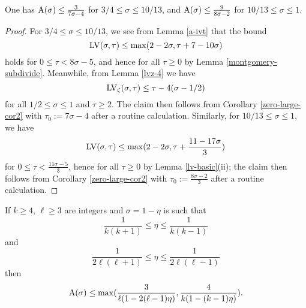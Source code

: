 \begin{corollary}\label{ivic-near-34}\cite[Theorem 11.5]{ivic}  One has $\mathrm{A}(\sigma) \leq \frac{3}{7\sigma-4}$ for $3/4 \leq \sigma \leq 10/13$, and $\mathrm{A}(\sigma) \leq \frac{9}{8\sigma-2}$ for $10/13 \leq \sigma \leq 1$.
\end{corollary}

\begin{proof}  For $3/4 \leq \sigma \leq 10/13$, we see from Lemma \ref{a-ivt} that the bound
$$ \mathrm{LV}(\sigma,\tau) \leq \max(2-2\sigma, \tau + 7 - 10\sigma )$$
holds for $0 \leq \tau < 8\sigma-5$, and hence for all $\tau \geq 0$ by Lemma \ref{montgomery-subdivide}.  Meanwhile, from Lemma \ref{lvz-4} we have
$$\mathrm{LV}_\zeta(\sigma,\tau) \leq \tau - 4 (\sigma-1/2)$$
for all $1/2 \leq \sigma \leq 1$ and $\tau \geq 2$. The claim then follows from Corollary
\ref{zero-large-cor2} with $\tau_0 := 7\sigma-4$ after a routine calculation.  Similarly, for $10/13 \leq \sigma \leq 1$, we have
$$ \mathrm{LV}(\sigma,\tau) \leq \max(2-2\sigma, \tau + \frac{11 - 17 \sigma}{3} )$$
for $0 \leq \tau < \frac{11\sigma-5}{3}$, hence for all $\tau \geq 0$ by Lemma \ref{lv-basic}(ii); the claim then follows from Corollary
\ref{zero-large-cor2} with $\tau_0 := \frac{8\sigma-2}{3}$ after a routine calculation.
\end{proof}


\begin{theorem}\label{pintz-density}\cite[Theorem 1]{pintz_density_2023}  If $k \geq 4$, $\ell \geq 3$ are integers and $\sigma = 1-\eta$ is such that
\begin{equation}\label{eta-b}
    \frac{1}{k(k+1)} \leq \eta \leq \frac{1}{k(k-1)}
\end{equation}
and
\begin{equation}\label{eta-l}
 \frac{1}{2\ell(\ell+1)} \leq \eta \leq \frac{1}{2\ell(\ell-1)}
\end{equation}
then
$$ \mathrm{A}(\sigma) \leq \max( \frac{3}{\ell(1-2(\ell-1)\eta)}, \frac{4}{k(1-(k-1)\eta)}).$$
\end{theorem}

